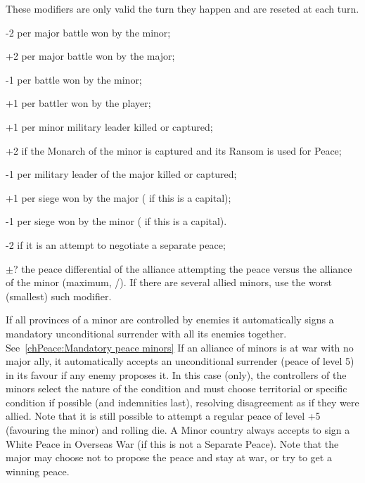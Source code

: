  These modifiers are only valid the turn
they happen and are reseted at each turn.
\begin{modlist}
\item[-2] per major battle won by the minor;  
\item[+2] per major battle won by the major;
\item[-1] per battle won by the minor;
\item[+1] per battler won by the player;
\item[+1] per minor military leader killed or captured;
\item[+2] if the Monarch of the minor is captured and its Ransom is used for
  Peace;
\item[-1] per military leader of the major killed or captured;
\item[+1] per siege won by the major ( if this is a capital); 
\item[-1] per siege won by the minor ( if this is a capital).
\end{modlist}
\begin{modlist}
\item[-2] if it is an attempt to negotiate a separate peace;
\item[$\pm$?] the peace differential of the alliance attempting the peace
  versus the alliance of the minor (maximum, /). If there
  are several allied minors, use the worst (smallest) such modifier.
\end{modlist}

\label{chPeace:automatic peace minor}
\bparag If all provinces of a minor are controlled by enemies it automatically
signs a mandatory unconditional surrender with all its enemies together.
See~\ref{chPeace:Mandatory peace minors}
\bparag If an alliance of minors is at war with no major ally, it
automatically accepts an unconditional surrender (peace of level 5) in its
favour if any enemy proposes it. In this case (only), the controllers of the
minors select the nature of the condition and must choose territorial or
specific condition if possible (and indemnities last), resolving disagreement
as if they were allied. Note that it is still possible to attempt a regular
peace of level +5 (favouring the minor) and rolling die.
\bparag A Minor country always accepts to sign a White Peace in Overseas War
(if this is not a Separate Peace). Note that the major may choose not to
propose the peace and stay at war, or try to get a winning peace.

